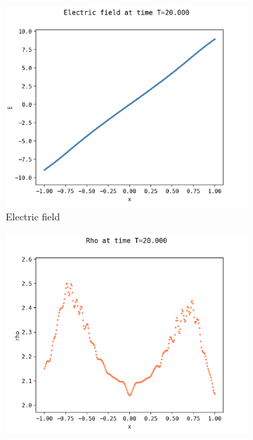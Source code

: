 \documentclass{article}
\numberwithin{equation}{section}
\newcommand{\mysubcaption}[1]{
	\vspace*{5pt}
	\begin{minipage}{0.8\linewidth}
		\begin{center}
			\footnotesize\emph{#1}
		\end{center}
	\end{minipage}
}
\newcommand{\imh}{\textheight} %
\newcommand{\imw}{\textwidth} %
\begin{document}
\begin{figure}
\begin{subfigure}{\textwidth}
		\includegraphics[height=\imh,width=\imw]{images/ET20_run5af_3.png}
		\caption{Electric field}
	\end{subfigure}
	\begin{subfigure}{\textwidth}
		\centering
		\includegraphics[height=\imh,width=\imw]{images/rhoT20_run5af.png}

\end{subfigure}
\end{figure}
\end{document}
